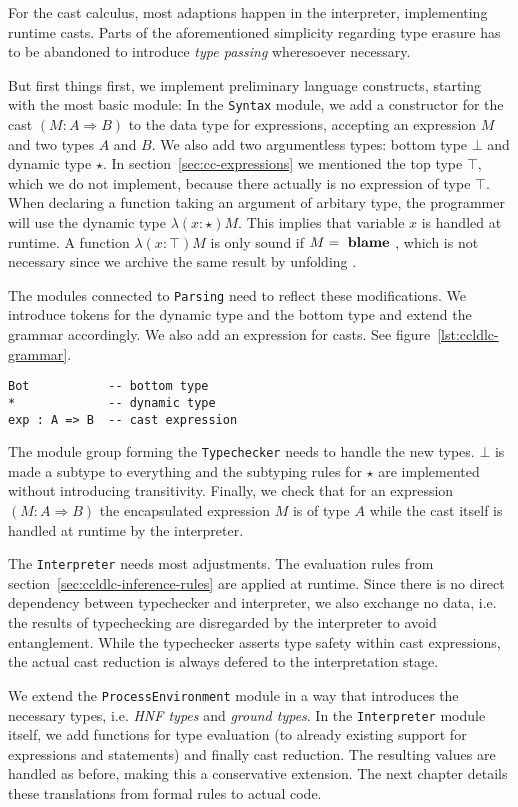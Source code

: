 For the cast calculus, most adaptions happen in the interpreter, implementing runtime casts. Parts of the aforementioned simplicity regarding type erasure has to be abandoned to introduce \emph{type passing} wheresoever necessary.

But first things first, we implement preliminary language constructs, starting with the most basic module: In the \texttt{Syntax} module, we add a constructor for the cast $(M : A \Rightarrow B)$ to the data type for expressions, accepting an expression $M$ and two types $A$ and $B$. We also add two argumentless types: bottom type $\bot$ and dynamic type $\star$. In section~\ref{sec:cc-expressions} we mentioned the top type $\top$, which we do not implement, because there actually is no expression of type $\top$. When declaring a function taking an argument of arbitary type, the programmer will use the dynamic type $\lambda(x:\star)M$. This implies that variable $x$ is handled at runtime. A function $\lambda(x:\top)M$ is only sound if $M = \text{ \textbf{blame} }$, which is not necessary since we archive the same result by unfolding .

The modules connected to \texttt{Parsing} need to reflect these modifications. We introduce tokens for the dynamic type and the bottom type and extend the grammar accordingly. We also add an expression for casts. See figure~\ref{lst:ccldlc-grammar}.

\begin{lstlisting}[language=ldgv,caption=Extensions to the parser for CCLDLC,label=lst:ccldlc-grammar]
Bot           -- bottom type
*             -- dynamic type
exp : A => B  -- cast expression
\end{lstlisting}

The module group forming the \texttt{Typechecker} needs to handle the new types. $\bot$ is made a subtype to everything and the subtyping rules for $\star$ are implemented without introducing transitivity. Finally, we check that for an expression $(M : A \Rightarrow B)$ the encapsulated expression $M$ is of type $A$ while the cast itself is handled at runtime by the interpreter.

The \texttt{Interpreter}  needs most adjustments. The evaluation rules from section~\ref{sec:ccldlc-inference-rules} are applied at runtime. Since there is no direct dependency between typechecker and interpreter, we also exchange no data, i.e. the results of typechecking are disregarded by the interpreter to avoid entanglement. While the typechecker asserts type safety within cast expressions, the actual cast reduction is always defered to the interpretation stage.


We extend the \texttt{ProcessEnvironment} module in a way that introduces the necessary types, i.e. \emph{HNF types} and \emph{ground types}. In the \texttt{Interpreter} module itself, we add functions for type evaluation (to already existing support for expressions and statements) and finally cast reduction. The resulting values are handled as before, making this a conservative extension. The next chapter details these translations from formal rules to actual code.
